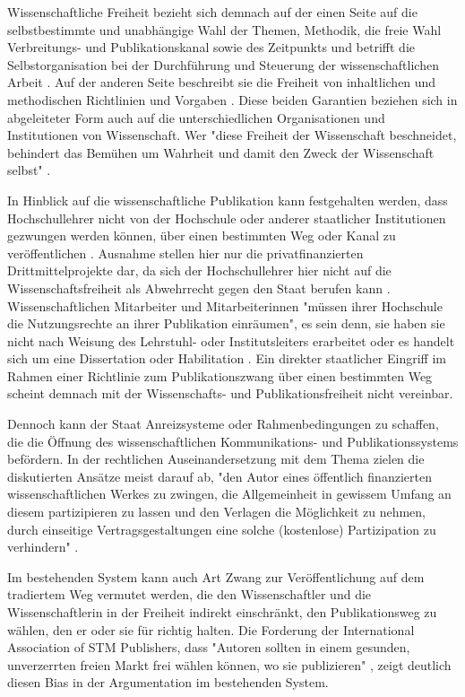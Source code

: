 Wissenschaftliche Freiheit bezieht sich demnach auf der einen Seite auf die selbstbestimmte und unabhängige Wahl der Themen, Methodik, die freie Wahl Verbreitungs- und Publikationskanal sowie des Zeitpunkts und betrifft die Selbstorganisation bei der Durchführung und Steuerung der wissenschaftlichen Arbeit \cite{Fehling_2014}. Auf der anderen Seite beschreibt sie die Freiheit von inhaltlichen und methodischen Richtlinien und Vorgaben \cite{Goetting_2015}. Diese beiden Garantien beziehen sich in abgeleiteter Form auch auf die unterschiedlichen Organisationen und Institutionen von Wissenschaft. Wer "diese Freiheit der Wissenschaft beschneidet, behindert das Bemühen um Wahrheit und damit den Zweck der Wissenschaft selbst" \cite{Oezmen_2015}.

In Hinblick auf die wissenschaftliche Publikation kann festgehalten werden, dass Hochschullehrer nicht von der Hochschule oder anderer staatlicher Institutionen gezwungen werden können, über einen bestimmten Weg oder Kanal zu veröffentlichen \cite{spindler_2006_rechtloa} \cite{dorschel_2006_open}. Ausnahme stellen hier nur die privatfinanzierten Drittmittelprojekte dar, da sich der Hochschullehrer hier nicht auf die Wissenschaftsfreiheit als Abwehrrecht gegen den Staat berufen kann \cite{spindler_2006_rechtloa}. Wissenschaftlichen Mitarbeiter und Mitarbeiterinnen "müssen ihrer Hochschule die Nutzungsrechte an ihrer Publikation einräumen", es sein denn, sie haben sie nicht nach Weisung des Lehrstuhl- oder Institutsleiters erarbeitet oder es handelt sich um eine Dissertation oder Habilitation \cite{spindler_2006_rechtloa}. Ein direkter staatlicher Eingriff im Rahmen einer Richtlinie zum Publikationszwang über einen bestimmten Weg scheint demnach mit der Wissenschafts- und Publikationsfreiheit nicht vereinbar.

Dennoch kann der Staat Anreizsysteme oder Rahmenbedingungen zu schaffen, die die Öffnung des wissenschaftlichen Kommunikations- und Publikationssystems befördern. In der rechtlichen Auseinandersetzung mit dem Thema zielen die diskutierten Ansätze meist darauf ab, "den Autor eines öffentlich finanzierten wissenschaftlichen Werkes zu zwingen, die Allgemeinheit in gewissem Umfang an diesem partizipieren zu lassen und den Verlagen die Möglichkeit zu nehmen, durch einseitige Vertragsgestaltungen eine solche (kostenlose) Partizipation zu verhindern" \cite{dorschel_2006_open}.

Im bestehenden System kann auch Art Zwang zur Veröffentlichung auf dem tradiertem Weg vermutet werden, die den Wissenschaftler und die Wissenschaftlerin in der Freiheit indirekt einschränkt, den Publikationsweg zu wählen, den er oder sie für richtig halten. Die Forderung der International Association of STM Publishers, dass "Autoren sollten in einem gesunden, unverzerrten freien Markt frei wählen können, wo sie publizieren" \cite{Brussels_Declaration_2007}, zeigt deutlich diesen Bias in der Argumentation im bestehenden System.


